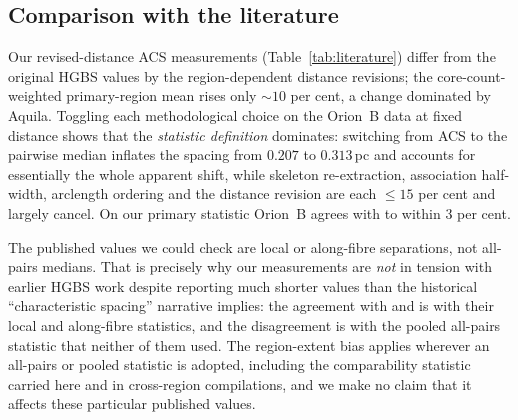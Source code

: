 \documentclass[usenatbib,twoside,twocolumn]{mnras}
\begin{document}
\subsection{Comparison with the literature}

Our revised-distance ACS measurements (Table~\ref{tab:literature}) differ from the original HGBS values by the region-dependent distance revisions; the core-count-weighted primary-region mean rises only $\sim10$ per cent, a change dominated by Aquila. Toggling each methodological choice on the Orion~B data at fixed distance shows that the \emph{statistic definition} dominates: switching from ACS to the pairwise median inflates the spacing from $0.207$ to $0.313$\,pc and accounts for essentially the whole apparent shift, while skeleton re-extraction, association half-width, arclength ordering and the distance revision are each $\leq15$ per cent and largely cancel. On our primary statistic Orion~B agrees with \citet{Konyves2020} to within $3$ per cent.

The published values we could check are local or along-fibre separations, not all-pairs medians. That is precisely why our measurements are \emph{not} in tension with earlier HGBS work despite reporting much shorter values than the historical ``characteristic spacing'' narrative implies: the agreement with \citet{Konyves2020} and \citet{Hacar2013} is with their local and along-fibre statistics, and the disagreement is with the pooled all-pairs statistic that neither of them used. The region-extent bias applies wherever an all-pairs or pooled statistic is adopted, including the comparability statistic carried here and in cross-region compilations, and we make no claim that it affects these particular published values.
\end{document}
